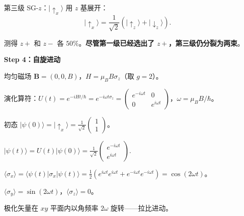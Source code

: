 \begin{derivationbox}
第三级 SG-$z$：$|\uparrow_x\rangle$ 用 $z$ 基展开：
\[
|\uparrow_x\rangle=\frac{1}{\sqrt{2}}(|\uparrow_z\rangle+|\downarrow_z\rangle).
\]

测得 $z+$ 和 $z-$ 各 $50\%$。\textbf{尽管第一级已经选出了 $z+$，第三级仍分裂为两束}。

\textbf{Step 4：自旋进动}

均匀磁场 $\mathbf{B}=(0,0,B)$，$H=\mu_B B\sigma_z$（取 $g=2$）。

演化算符：$U(t)=e^{-iHt/\hbar}=e^{-i\omega t\sigma_z}=\begin{pmatrix}e^{-i\omega t}&0\\0&e^{i\omega t}\end{pmatrix}$，$\omega=\mu_B B/\hbar$。

初态 $|\psi(0)\rangle=|\uparrow_x\rangle=\frac{1}{\sqrt{2}}\begin{pmatrix}1\\1\end{pmatrix}$。

$|\psi(t)\rangle=U(t)|\psi(0)\rangle=\frac{1}{\sqrt{2}}\begin{pmatrix}e^{-i\omega t}\\e^{i\omega t}\end{pmatrix}$.

$\langle\sigma_x\rangle=\langle\psi(t)|\sigma_x|\psi(t)\rangle=\frac12(e^{i\omega t}e^{i\omega t}+e^{-i\omega t}e^{-i\omega t})=\cos(2\omega t)$。

$\langle\sigma_y\rangle=\sin(2\omega t)$，$\langle\sigma_z\rangle=0$。

极化矢量在 $xy$ 平面内以角频率 $2\omega$ 旋转——拉比进动。
\end{derivationbox}

\vspace{1em}
